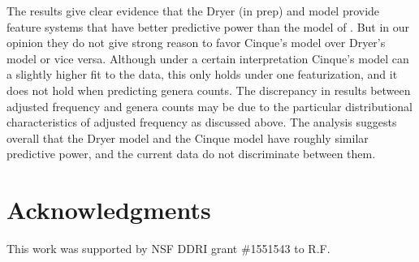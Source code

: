 \documentclass[11pt]{article}
\begin{document}
The results give clear evidence that the Dryer (in prep) and \citet{cinque2005deriving} model provide feature systems that have better predictive power than the model of \citet{cysouw2010dealing}. But in our opinion they do not give strong reason to favor Cinque's model over Dryer's model or vice versa. Although under a certain interpretation Cinque's model can a slightly higher fit to the data, this only holds under one featurization, and it does not hold when predicting genera counts. The discrepancy in results between adjusted frequency and genera counts may be due to the particular distributional characteristics of adjusted frequency as discussed above. The analysis suggests overall that the Dryer model and the Cinque model have roughly similar predictive power, and the current data do not discriminate between them.


\section*{Acknowledgments} 

This work was supported by NSF DDRI grant \#1551543 to R.F.




\end{document}
